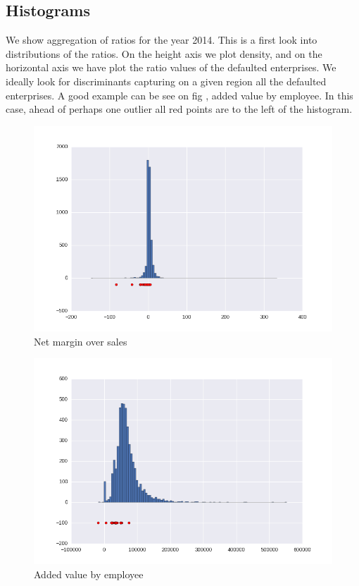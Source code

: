 \documentclass[DIV=calc, paper=a4, fontsize=11pt, twocolumn]{scrartcl}
\begin{document}
\begin{appendices}

\clearpage
\section{Histograms}
We show aggregation of ratios for the year 2014. This is a first look into distributions of the ratios. On the height axis we plot density, 
and on the horizontal axis we have plot the ratio values of the defaulted enterprises.
We ideally look for discriminants capturing on a given region all the defaulted enterprises. A good example can be see on fig , added value by employee. In this case, ahead of perhaps one outlier all red points are to the left of the histogram.
\begin{figure}[h]
  \centering
    \includegraphics[width=0.8\linewidth]{r2}
  \caption{Net margin over sales}
\end{figure}
\begin{figure}[h]
  \centering
  \includegraphics[width=0.8\linewidth]{r4}
  \caption{Added value by employee}
\end{figure}
\begin{figure}[h]

\end{figure}
\end{appendices}
\end{document}
